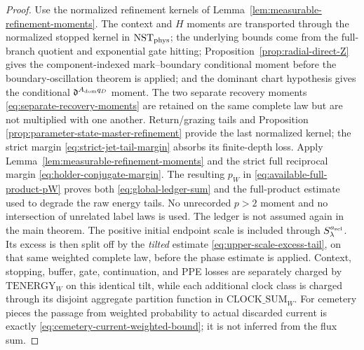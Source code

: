 \documentclass[11pt]{article}
\begin{document}
\begin{proof}
Use the normalized refinement kernels of
Lemma~\ref{lem:measurable-refinement-moments}.  The context and $H$ moments
are transported through the normalized stopped kernel in
$\mathrm{NST}_{\rm phys}$; the underlying bounds come from the full-branch
quotient and exponential gate hitting;
Proposition~\ref{prop:radial-direct-Z} gives the component-indexed
mark--boundary conditional moment before the boundary-oscillation theorem is
applied; and the dominant chart hypothesis gives the conditional
$\mathfrak d^{A_{\rm dom}q_D}$ moment.  The two separate recovery moments
\eqref{eq:separate-recovery-moments} are retained on the same complete law
but are not multiplied with one another.  Return/grazing tails and Proposition
\ref{prop:parameter-state-master-refinement} provide the last normalized
kernel; the strict margin \eqref{eq:strict-jet-tail-margin} absorbs its
finite-depth loss.  Apply Lemma~\ref{lem:measurable-refinement-moments} and
the strict full reciprocal margin \eqref{eq:holder-conjugate-margin}.  The
resulting $p_W$ in \eqref{eq:available-full-product-pW} proves both
\eqref{eq:global-ledger-sum} and the full-product estimate used to degrade
the raw energy tails.  No unrecorded $p>2$ moment and no intersection of
unrelated label laws is used.  The ledger is not assumed again in the main
theorem.
The positive initial endpoint scale is included through
$S_\lambda^{a_{\rm scl}}$.  Its excess is then split off by the
\emph{tilted} estimate \eqref{eq:upper-scale-excess-tail}, on that same
weighted complete law, before the phase estimate is applied.  Context,
stopping, buffer, gate, continuation, and PPE losses are separately charged
by $\mathrm{TENERGY}_{W}$ on this identical tilt, while each additional
clock class is charged through its disjoint aggregate partition function in
$\mathrm{CLOCK\_SUM}_{W}$.  For cemetery pieces the
passage from weighted probability to actual discarded current is exactly
\eqref{eq:cemetery-current-weighted-bound}; it is not inferred from the
flux sum.
\end{proof}
\end{document}
